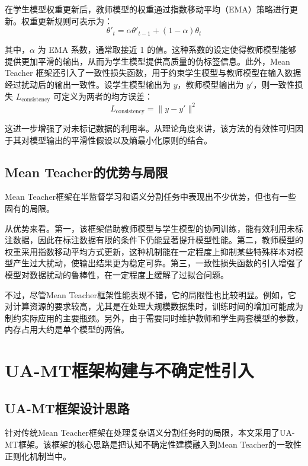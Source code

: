 \documentclass{xduugthesis}
\begin{document}
在学生模型权重更新后，教师模型的权重通过指数移动平均（EMA）策略进行更新。权重更新规则可表示为：
\begin{equation}
    \theta'_{t} = \alpha \theta'_{t-1} + (1 - \alpha) \theta_{t}
\end{equation}

其中，$\alpha$ 为 EMA 系数，通常取接近 1 的值。这种系数的设定使得教师模型能够提供更加平滑的输出，从而为学生模型提供高质量的伪标签信息。此外，Mean Teacher 框架还引入了一致性损失函数，用于约束学生模型与教师模型在输入数据经过扰动后的输出一致性。设学生模型输出为 $y$，教师模型输出为 $y'$，则一致性损失 $L_{\text{consistency}}$ 可定义为两者的均方误差：
\begin{equation}
    L_{\text{consistency}} = \| y - y' \|^2
\end{equation}

这进一步增强了对未标记数据的利用率。从理论角度来讲，该方法的有效性可归因于其对模型输出的平滑性假设以及熵最小化原则的结合。

\subsection{Mean Teacher的优势与局限}
Mean Teacher框架在半监督学习和语义分割任务中表现出不少优势，但也有一些固有的局限。

从优势来看。第一，该框架借助教师模型与学生模型的协同训练，能有效利用未标注数据，因此在标注数据有限的条件下仍能显著提升模型性能。第二，教师模型的权重采用指数移动平均方式更新，这种机制能在一定程度上抑制某些特殊样本对模型产生过大扰动，使输出结果更为稳定可靠。第三，一致性损失函数的引入增强了模型对数据扰动的鲁棒性，在一定程度上缓解了过拟合问题。

不过，尽管Mean Teacher框架性能表现不错，它的局限性也比较明显。例如，它对计算资源的要求较高，尤其是在处理大规模数据集时，训练时间的增加可能成为制约实际应用的主要瓶颈。另外，由于需要同时维护教师和学生两套模型的参数，内存占用大约是单个模型的两倍。

\section{UA-MT框架构建与不确定性引入}
\subsection{UA-MT框架设计思路}

针对传统Mean Teacher框架在处理复杂语义分割任务时的局限，本文采用了UA-MT\cite{Yu2019UncertaintyawareSM}框架。该框架的核心思路是把认知不确定性建模融入到Mean Teacher的一致性正则化机制当中。
\end{document}

